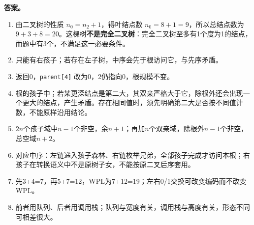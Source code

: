 \textbf{答案。}

\begin{enumerate}
\def\labelenumi{\arabic{enumi}.}
\item
  由二叉树的性质 \(n_0=n_2+1\)，得叶结点数 \(n_0=8+1=9\)，所以总结点数为 \(9+3+8=20\)。这棵树\textbf{不是完全二叉树}：完全二叉树至多有1个度为1的结点，而题中有3个，不满足这一必要条件。
\item
  只能有右孩子；若存在左子树，中序会先于根访问它，与先序矛盾。
\item
  返回0，\texttt{parent[4]} 改为0，2仍指向0，根规模不变。
\item
  根的孩子中；若某更深结点是第二大，其双亲严格大于它，除根外还会出现一个更大的结点，产生矛盾。存在相同值时，须先明确第二大是否按不同值计数，不能原样沿用结论。
\item
  \(2n\)个孩子域中\(n-1\)个非空，余\(n+1\)；再加\(n\)个双亲域，除根外\(n-1\)个非空，总空域\(n+2\)。
\item
  对应中序：左链递入孩子森林、右链枚举兄弟，全部孩子完成才访问本根；右孩子在转换语义中不是原树子女，不能按原二叉后序套用。
\item
  先3+4=7，再5+7=12，WPL为7+12=19；左右0/1交换可改变编码而不改变WPL。
\item
  前者用队列、后者用调用栈；队列与宽度有关，调用栈与高度有关，形态不同可相差很大。
\end{enumerate}
